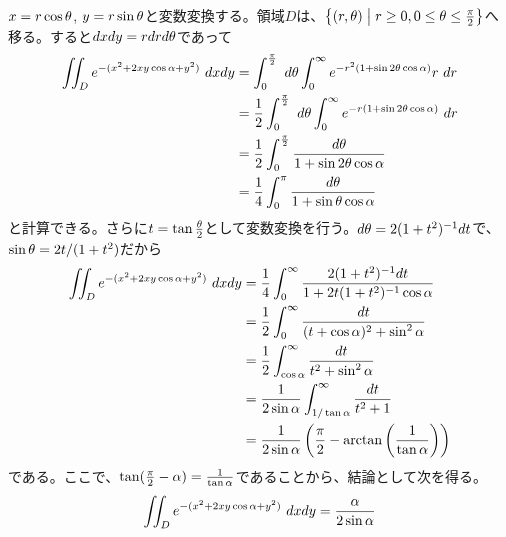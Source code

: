 

\begin{sol}
$x = r \cos {\theta}$, $y = r \sin {\theta}$と変数変換する。領域$D$は、$\left\{ (r,{\theta}) \mathrel{} \middle| \mathrel{} r \geq 0, 0 \leq {\theta} \leq \frac{\pi}{2}  \right\}$へ移る。すると$dx dy = r dr d{\theta}$であって
\begin{align*}
  \iint_D e^{-(x^2 + 2xy \cos {\alpha} + y^2)} \ dx dy &= \int_0^{\frac{\pi}{2}} \ d{\theta} \int_{0}^{\infty} e^{-r^2(1 + \sin 2 {\theta} \cos {\alpha})} r \ dr \\
  &= \frac{1}{2} \int_0^{\frac{\pi}{2}} \ d{\theta} \int_{0}^{\infty} e^{-r(1 + \sin 2 {\theta} \cos {\alpha})}  \ dr \\
  &= \frac{1}{2} \int_0^{\frac{\pi}{2}} \frac{d {\theta}}{1 + \sin 2{\theta} \cos {\alpha}} \\
  &= \frac{1}{4} \int_0^{\pi} \frac{d {\theta}}{1 + \sin {\theta} \cos {\alpha}}
\end{align*}
と計算できる。さらに$t = \tan \frac{{\theta}}{2}$として変数変換を行う。$d{\theta} = 2(1+t^2)^{-1} dt$で、$\sin {\theta} = 2t / (1+t^2)$だから
\begin{align*}
    \iint_D e^{-(x^2 + 2xy \cos {\alpha} + y^2)} \ dx dy &= \frac{1}{4} \int_0^{\infty} \frac{2(1+t^2)^{-1} dt}{1 + 2t(1+t^2)^{-1}  \cos {\alpha}} \\
    &= \frac{1}{2} \int_0^{\infty} \frac{dt}{(t+ \cos {\alpha})^2 + \sin^2 {\alpha} } \\
    &= \frac{1}{2} \int_{\cos {\alpha}}^{\infty} \frac{dt}{t^2 + \sin^2 {\alpha} } \\
    &= \frac{1}{2 \sin {\alpha}} \int_{1 / \tan {\alpha}}^{\infty} \frac{dt}{t^2 + 1} \\
    &= \frac{1}{2 \sin {\alpha}} \left( \frac{\pi}{2} - \arctan \left( \frac{1}{\tan {\alpha}} \right) \right)
\end{align*}
である。ここで、$\tan(\frac{\pi}{2} - {\alpha} ) = \frac{1}{\tan {\alpha}}$であることから、結論として次を得る。
\[
\iint_D e^{-(x^2 + 2xy \cos {\alpha} + y^2)} \ dx dy = \frac{{\alpha}}{2 \sin {\alpha}}
\]
\end{sol}


\newpage


